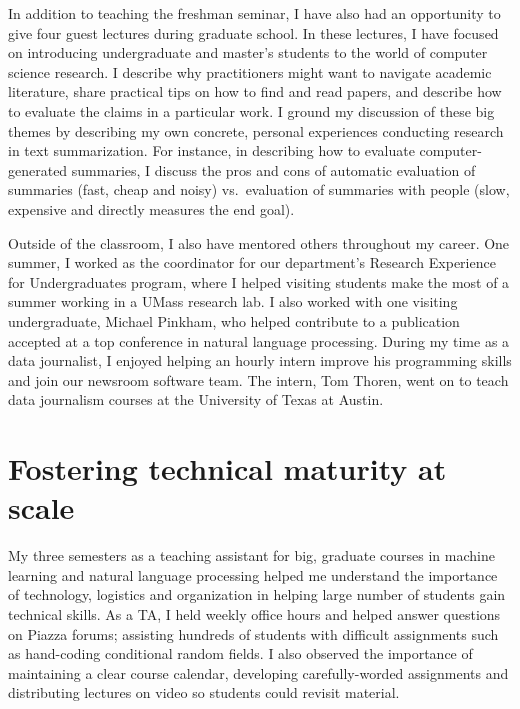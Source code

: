 \documentclass{article}
\begin{document}
In addition to teaching the freshman seminar, I have also had an opportunity to give four guest lectures during graduate school. In these lectures, I have focused on introducing undergraduate and master's students to the world of computer science research. I describe why practitioners might want to navigate academic literature, share practical tips on how to find and read papers, and describe how to evaluate the claims in a particular work. I ground my discussion of these big themes by describing my own concrete, personal experiences conducting research in text summarization. For instance, in describing how to evaluate computer-generated summaries, I discuss the pros and cons of automatic evaluation of summaries (fast, cheap and noisy) vs.\  evaluation of summaries with people (slow, expensive and directly measures the end goal).

Outside of the classroom, I also have mentored others throughout my career. One summer, I worked as the coordinator for our department's Research Experience for Undergraduates program, where I helped visiting students make the most of a summer working in a UMass research lab. I also worked with one visiting undergraduate, Michael Pinkham, who helped contribute to a publication accepted at a top conference in natural language processing. During my time as a data journalist, I enjoyed helping an hourly intern improve his programming skills and join our newsroom software team. The intern, Tom Thoren, went on to teach data journalism courses at the University of Texas at Austin. 

\section*{\normalsize Fostering technical maturity at scale}

My three semesters as a teaching assistant for big, graduate courses in machine learning and natural language processing helped me understand the importance of technology, logistics and organization in helping large number of students gain technical skills. As a TA, I held weekly office hours and helped answer questions on Piazza forums; assisting hundreds of students with difficult assignments such as hand-coding conditional random fields. I also observed the importance of maintaining a clear course calendar, developing carefully-worded assignments and distributing lectures on video so students could revisit material.
\end{document}
